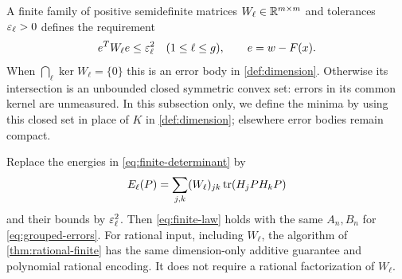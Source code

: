 A finite family of positive semidefinite matrices $W_\ell\in\mathbb R^{m\times m}$
and tolerances $\varepsilon_\ell>0$ defines the requirement
\begin{equation}\label{eq:grouped-errors}
 e^TW_\ell e\le\varepsilon_\ell^2\quad(1\le\ell\le g),
 \qquad e=w-F(x).
\end{equation}
When $\bigcap_\ell\ker W_\ell=\{0\}$ this is an error body in
\cref{def:dimension}. Otherwise its intersection is an unbounded closed
symmetric convex set: errors in its common kernel are unmeasured. In this
subsection only, we define the minima by using this closed set in place
of $K$ in \cref{def:dimension}; elsewhere error bodies remain compact.

\begin{theorem}\label{thm:grouped-covariance}
Replace the energies in \eqref{eq:finite-determinant} by
\[
 E_\ell(P)=\sum_{j,k}(W_\ell)_{jk}\operatorname{tr}(H_jPH_kP)
\]
and their bounds by $\varepsilon_\ell^2$. Then \eqref{eq:finite-law} holds with
the same $A_n,B_n$ for \eqref{eq:grouped-errors}. For rational input,
including $W_\ell$, the algorithm of \cref{thm:rational-finite} has the
same dimension-only additive guarantee and polynomial rational encoding.
It does not require a rational factorization of $W_\ell$.
\end{theorem}
